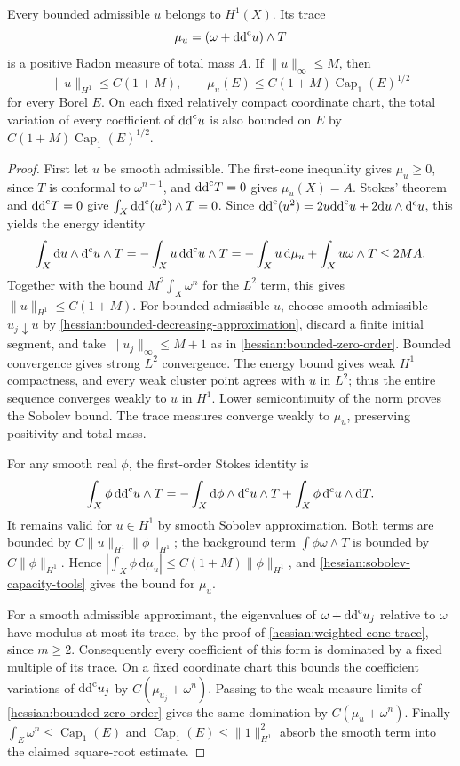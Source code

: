 \begin{lemma}\label{hessian:bounded-sobolev-trace}
Every bounded admissible $u$ belongs to $H^1(X)$. Its trace
\[
 \mu_u=(\omega+\mathrm{dd}^{\mathrm{c}} u)\wedge T
\]
is a positive Radon measure of total mass $A$. If $\|u\|_\infty\leq M$,
then
\[
 \|u\|_{H^1}\leq C(1+M),\qquad
 \mu_u(E)\leq C(1+M)\operatorname{Cap}_1(E)^{1/2}
\]
for every Borel $E$. On each fixed relatively compact coordinate chart,
the total variation of every coefficient of $\mathrm{dd}^{\mathrm{c}} u$ is also bounded
on $E$ by $C(1+M)\operatorname{Cap}_1(E)^{1/2}$.
\end{lemma}
\begin{proof}
First let $u$ be smooth admissible. The first-cone inequality gives
$\mu_u\geq0$, since $T$ is conformal to $\omega^{n-1}$, and
$\mathrm{dd}^{\mathrm{c}} T=0$ gives $\mu_u(X)=A$. Stokes' theorem and $\mathrm{dd}^{\mathrm{c}} T=0$ give
$\int_X\mathrm{dd}^{\mathrm{c}}(u^2)\wedge T=0$. Since
$\mathrm{dd}^{\mathrm{c}}(u^2)=2u\mathrm{dd}^{\mathrm{c}} u+2\mathrm du\wedge\mathrm d^{\mathrm c} u$, this yields the energy
identity
\[
 \int_X\mathrm du\wedge\mathrm d^{\mathrm c} u\wedge T
   =-\int_Xu\,\mathrm{dd}^{\mathrm{c}} u\wedge T
   =-\int_Xu\,\mathrm d\mu_u+\int_Xu\omega\wedge T
   \leq2MA.
\]
Together with the bound $M^2\int_X\omega^n$ for the $L^2$ term, this
gives $\|u\|_{H^1}\leq C(1+M)$.
For bounded admissible $u$, choose smooth admissible $u_j\downarrow u$
by \cref{hessian:bounded-decreasing-approximation}, discard a finite
initial segment, and take $\|u_j\|_\infty\leq M+1$ as in
\cref{hessian:bounded-zero-order}. Bounded convergence gives strong
$L^2$ convergence. The energy bound gives weak $H^1$ compactness, and
every weak cluster point agrees with $u$ in $L^2$; thus the entire
sequence converges weakly to $u$ in $H^1$. Lower semicontinuity of the
norm proves the Sobolev bound.
The trace measures converge weakly to $\mu_u$, preserving positivity and total mass.

For any smooth real $\phi$, the first-order Stokes identity is
\[
 \int_X\phi\,\mathrm{dd}^{\mathrm{c}} u\wedge T
  =-\int_X\mathrm d\phi\wedge\mathrm d^{\mathrm c} u\wedge T
       +\int_X\phi\,\mathrm d^{\mathrm c} u\wedge\mathrm dT.
\]
It remains valid for $u\in H^1$ by smooth Sobolev approximation.
Both terms are bounded by $C\|u\|_{H^1}\|\phi\|_{H^1}$; the background term
$\int\phi\omega\wedge T$ is bounded by $C\|\phi\|_{H^1}$.
Hence $|\int_X\phi\,\mathrm d\mu_u|\leq C(1+M)\|\phi\|_{H^1}$, and
\cref{hessian:sobolev-capacity-tools} gives the bound for $\mu_u$.

For a smooth admissible approximant, the eigenvalues of
$\omega+\mathrm{dd}^{\mathrm{c}} u_j$ relative to $\omega$ have modulus at most its trace,
by the proof of \cref{hessian:weighted-cone-trace}, since $m\geq2$.
Consequently every coefficient of this form is dominated by a fixed
multiple of its trace.
On a fixed coordinate chart this bounds the coefficient variations of
$\mathrm{dd}^{\mathrm{c}} u_j$ by $C(\mu_{u_j}+\omega^n)$. Passing to the weak measure
limits of \cref{hessian:bounded-zero-order} gives the same domination
by $C(\mu_u+\omega^n)$. Finally
$\int_E\omega^n\leq\operatorname{Cap}_1(E)$ and
$\operatorname{Cap}_1(E)\leq\|1\|_{H^1}^2$ absorb the smooth term into the
claimed square-root estimate.
\end{proof}

